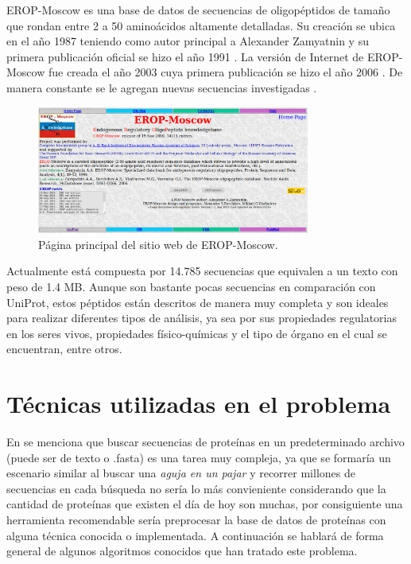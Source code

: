 EROP-Moscow es una base de datos de secuencias de oligopéptidos de tamaño que rondan entre 2 a 50 aminoácidos altamente detalladas. Su creación se ubica en el año 1987 teniendo como autor principal a Alexander Zamyatnin y su primera publicación oficial se hizo el año 1991 \cite{erop2}. La versión de Internet de EROP-Moscow fue creada el año 2003 cuya primera publicación se hizo el año 2006 \cite{erop3}. De manera constante se le agregan nuevas secuencias investigadas \cite{eropmoscow}.

\begin{figure}[h]
    \centering
    \includegraphics[width=0.8\textwidth]{./images/eropmoscow_main.png}
    \caption{Página principal del sitio web de EROP-Moscow.}
    \label{fig:image8}
\end{figure}

Actualmente está compuesta por 14.785 secuencias que equivalen a un texto con peso de 1.4 MB. Aunque son bastante pocas secuencias en comparación con UniProt, estos péptidos están descritos de manera muy completa y son ideales para realizar diferentes tipos de análisis, ya sea por sus propiedades regulatorias en los seres vivos, propiedades físico-químicas y el tipo de órgano en el cual se encuentran, entre otros.

\section{Técnicas utilizadas en el problema}

En \cite{searching} se menciona que buscar secuencias de proteínas en un predeterminado archivo (puede ser de texto o .fasta) es una tarea muy compleja, ya que se formaría un escenario similar al buscar una {\textit{aguja en un pajar}} y recorrer millones de secuencias en cada búsqueda no sería lo más convieniente considerando que la cantidad de proteínas que existen el día de hoy son muchas, por consiguiente una herramienta recomendable sería preprocesar la base de datos de proteínas con alguna técnica conocida o implementada. A continuación se hablará de forma general de algunos algoritmos conocidos que han tratado este problema.

